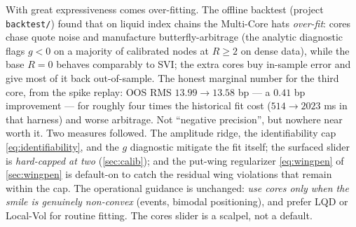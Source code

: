 \documentclass[11pt]{article}
\begin{document}
\begin{caution}
With great expressiveness comes over-fitting. The offline backtest (project
\texttt{backtest/}) found that on liquid index chains the Multi-Core hats
\emph{over-fit}: cores chase quote noise and manufacture butterfly-arbitrage
(the analytic diagnostic flags $g<0$ on a majority of calibrated nodes at $R\ge2$
on dense data), while the base $R=0$ behaves comparably to SVI; the extra
cores buy in-sample error and give most of it back out-of-sample. The honest
marginal number for the third core, from the spike replay: OOS RMS
$13.99\to13.58$ bp --- a $0.41$ bp improvement --- for roughly four times the
historical fit cost ($514\to2023$ ms in that harness) and worse arbitrage.
Not ``negative precision'', but nowhere near worth it. Two measures followed. The amplitude ridge,
the identifiability cap \eqref{eq:identifiability}, and the $g$ diagnostic mitigate
the fit itself; the surfaced slider is \emph{hard-capped at two} (\cref{sec:calib});
and the put-wing regularizer \eqref{eq:wingpen} of \cref{sec:wingpen} is default-on
to catch the residual wing violations that remain within the cap. The operational
guidance is unchanged: \emph{use cores only when the smile is genuinely non-convex}
(events, bimodal positioning), and prefer LQD or Local-Vol for routine fitting. The
cores slider is a scalpel, not a default.
\end{caution}
\end{document}

